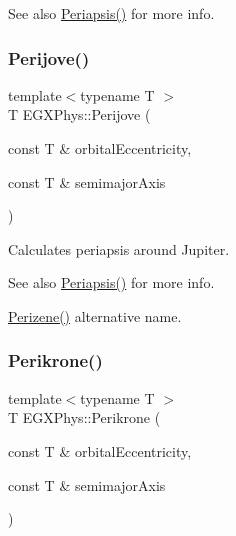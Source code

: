 \begin{DoxySeeAlso}{See also}
\hyperlink{group___astrophysics_ga4414ac75539371ec874a3d25cad6c9fe}{Periapsis()} for more info. 
\end{DoxySeeAlso}
\mbox{\label{group___astrophysics_ga075052f7ff9aa1d5fdf4501b493be86b}} 
\subsubsection{\texorpdfstring{Perijove()}{Perijove()}}
{\footnotesize\ttfamily template$<$typename T $>$ \\
T E\+G\+X\+Phys\+::\+Perijove (\begin{DoxyParamCaption}\item[{const T \&}]{orbital\+Eccentricity,  }\item[{const T \&}]{semimajor\+Axis }\end{DoxyParamCaption})}



Calculates periapsis around Jupiter. 

\begin{DoxySeeAlso}{See also}
\hyperlink{group___astrophysics_ga4414ac75539371ec874a3d25cad6c9fe}{Periapsis()} for more info. 

\hyperlink{group___astrophysics_ga0523c65b7fc26e675388b2c3d38aa00b}{Perizene()} alternative name. 
\end{DoxySeeAlso}
\mbox{\label{group___astrophysics_gaa56f74c44a3583b8f0d13b821c1d7422}} 
\subsubsection{\texorpdfstring{Perikrone()}{Perikrone()}}
{\footnotesize\ttfamily template$<$typename T $>$ \\
T E\+G\+X\+Phys\+::\+Perikrone (\begin{DoxyParamCaption}\item[{const T \&}]{orbital\+Eccentricity,  }\item[{const T \&}]{semimajor\+Axis }\end{DoxyParamCaption})}



